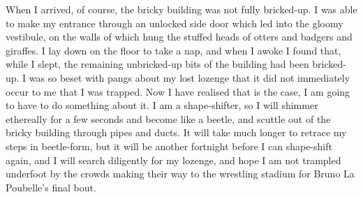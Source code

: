 When I arrived, of course, the bricky building was not fully bricked-up. I was able to make my entrance through an unlocked side door which led into the gloomy vestibule, on the walls of which hung the stuffed heads of otters and badgers and giraffes. I lay down on the floor to take a nap, and when I awoke I found that, while I slept, the remaining unbricked-up bits of the building had been bricked-up. I was so beset with pangs about my lost lozenge that it did not immediately occur to me that I was trapped. Now I have realised that is the case, I am going to have to do something about it. I am a shape-shifter, so I will shimmer ethereally for a few seconds and become like a beetle, and scuttle out of the bricky building through pipes and ducts. It will take much longer to retrace my steps in beetle-form, but it will be another fortnight before I can shape-shift again, and I will search diligently for my lozenge, and hope I am not trampled underfoot by the crowds making their way to the wrestling stadium for Bruno La Poubelle's final bout.